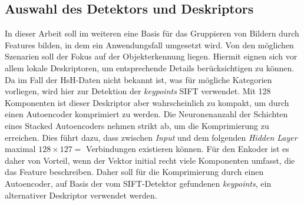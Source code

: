 \subsection{Auswahl des Detektors und Deskriptors}

In dieser Arbeit soll im weiteren eine Basis für das Gruppieren von Bildern durch Features bilden, in dem ein Anwendungsfall umgesetzt wird. Von den möglichen Szenarien soll der Fokus auf der Objekterkennung liegen. Hiermit eignen sich vor allem lokale Deskriptoren, um entsprechende Details berücksichtigen zu können. Da im Fall der HsH-Daten nicht bekannt ist, was für mögliche Kategorien vorliegen, wird hier zur Detektion der \textit{keypoints} SIFT verwendet. Mit 128 Komponenten ist dieser Deskriptor aber wahrscheinlich zu kompakt, um durch einen Autoencoder komprimiert zu werden. Die Neuronenanzahl der Schichten eines Stacked Autoencoders nehmen strikt ab, um die Komprimierung zu erreichen. Dies führt dazu, dass zwischen \textit{Input} und dem folgenden \textit{Hidden Layer} maximal $128 \times 127 = $ Verbindungen existieren können. Für den Enkoder ist es daher von Vorteil, wenn der Vektor initial recht viele Komponenten umfasst, die das Feature beschreiben. Daher soll für die Komprimierung durch einen Autoencoder, auf Basis der vom SIFT-Detektor gefundenen \textit{keypoints}, ein alternativer Deskriptor verwendet werden. 